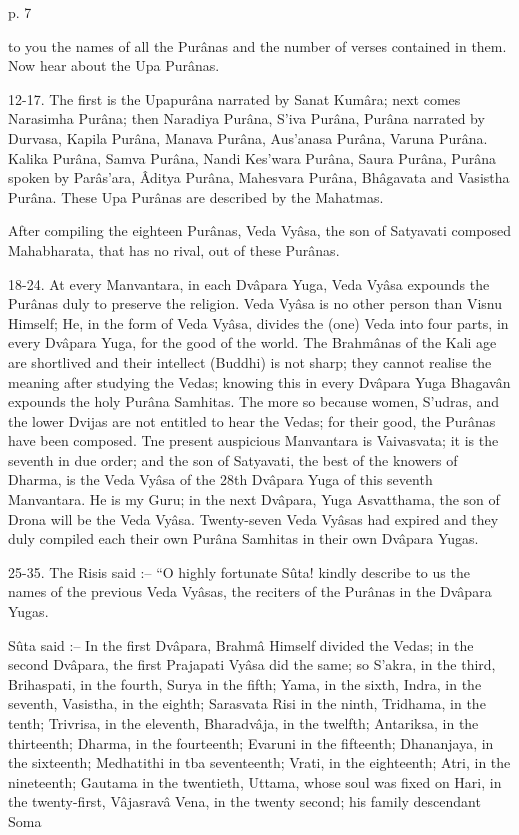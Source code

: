  

p. 7

 

to you the names of all the Purânas and the number of verses contained in them. Now hear about the Upa Purânas.

 

12-17. The first is the Upapurâna narrated by Sanat Kumâra; next comes Narasimha Purâna; then Naradiya Purâna, S’iva Purâna, Purâna narrated by Durvasa, Kapila Purâna, Manava Purâna, Aus’anasa Purâna, Varuna Purâna. Kalika Purâna, Samva Purâna, Nandi Kes’wara Purâna, Saura Purâna, Purâna spoken by Parâs’ara, Âditya Purâna, Mahesvara Purâna, Bhâgavata and Vasistha Purâna. These Upa Purânas are described by the Mahatmas.

 

After compiling the eighteen Purânas, Veda Vyâsa, the son of Satyavati composed Mahabharata, that has no rival, out of these Purânas.

 

18-24. At every Manvantara, in each Dvâpara Yuga, Veda Vyâsa expounds the Purânas duly to preserve the religion. Veda Vyâsa is no other person than Visnu Himself; He, in the form of Veda Vyâsa, divides the (one) Veda into four parts, in every Dvâpara Yuga, for the good of the world. The Brahmânas of the Kali age are shortlived and their intellect (Buddhi) is not sharp; they cannot realise the meaning after studying the Vedas; knowing this in every Dvâpara Yuga Bhagavân expounds the holy Purâna Samhitas. The more so because women, S’udras, and the lower Dvijas are not entitled to hear the Vedas; for their good, the Purânas have been composed. Tne present auspicious Manvantara is Vaivasvata; it is the seventh in due order; and the son of Satyavati, the best of the knowers of Dharma, is the Veda Vyâsa of the 28th Dvâpara Yuga of this seventh Manvantara. He is my Guru; in the next Dvâpara, Yuga Asvatthama, the son of Drona will be the Veda Vyâsa. Twenty-seven Veda Vyâsas had expired and they duly compiled each their own Purâna Samhitas in their own Dvâpara Yugas.

 

25-35. The Risis said :-- “O highly fortunate Sûta! kindly describe to us the names of the previous Veda Vyâsas, the reciters of the Purânas in the Dvâpara Yugas.

 

Sûta said :-- In the first Dvâpara, Brahmâ Himself divided the Vedas; in the second Dvâpara, the first Prajapati Vyâsa did the same; so S’akra, in the third, Brihaspati, in the fourth, Surya in the fifth; Yama, in the sixth, Indra, in the seventh, Vasistha, in the eighth; Sarasvata Risi in the ninth, Tridhama, in the tenth; Trivrisa, in the eleventh, Bharadvâja, in the twelfth; Antariksa, in the thirteenth; Dharma, in the fourteenth; Evaruni in the fifteenth; Dhananjaya, in the sixteenth; Medhatithi in tba seventeenth; Vrati, in the eighteenth; Atri, in the nineteenth; Gautama in the twentieth, Uttama, whose soul was fixed on Hari, in the twenty-first, Vâjasravâ Vena, in the twenty second; his family descendant Soma

